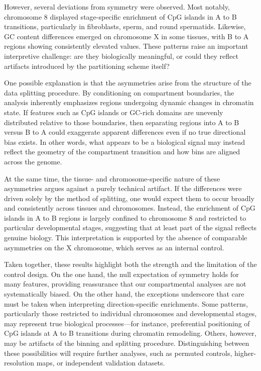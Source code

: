 \documentclass[
  a4paper,
  openany]{scrbook}
\begin{document}
However, several deviations from symmetry were observed. Most notably,
chromosome 8 displayed stage-specific enrichment of CpG islands in A to
B transitions, particularly in fibroblasts, sperm, and round spermatids.
Likewise, GC content differences emerged on chromosome X in some
tissues, with B to A regions showing consistently elevated values. These
patterns raise an important interpretive challenge: are they
biologically meaningful, or could they reflect artifacts introduced by
the partitioning scheme itself?

One possible explanation is that the asymmetries arise from the
structure of the data splitting procedure. By conditioning on
compartment boundaries, the analysis inherently emphasizes regions
undergoing dynamic changes in chromatin state. If features such as CpG
islands or GC-rich domains are unevenly distributed relative to those
boundaries, then separating regions into A to B versus B to A could
exaggerate apparent differences even if no true directional bias exists.
In other words, what appears to be a biological signal may instead
reflect the geometry of the compartment transition and how bins are
aligned across the genome.

At the same time, the tissue- and chromosome-specific nature of these
asymmetries argues against a purely technical artifact. If the
differences were driven solely by the method of splitting, one would
expect them to occur broadly and consistently across tissues and
chromosomes. Instead, the enrichment of CpG islands in A to B regions is
largely confined to chromosome 8 and restricted to particular
developmental stages, suggesting that at least part of the signal
reflects genuine biology. This interpretation is supported by the
absence of comparable asymmetries on the X chromosome, which serves as
an internal control.

Taken together, these results highlight both the strength and the
limitation of the control design. On the one hand, the null expectation
of symmetry holds for many features, providing reassurance that our
compartmental analyses are not systematically biased. On the other hand,
the exceptions underscore that care must be taken when interpreting
direction-specific enrichments. Some patterns, particularly those
restricted to individual chromosomes and developmental stages, may
represent true biological processes---for instance, preferential
positioning of CpG islands at A to B transitions during chromatin
remodeling. Others, however, may be artifacts of the binning and
splitting procedure. Distinguishing between these possibilities will
require further analyses, such as permuted controls, higher-resolution
maps, or independent validation datasets.
\end{document}
